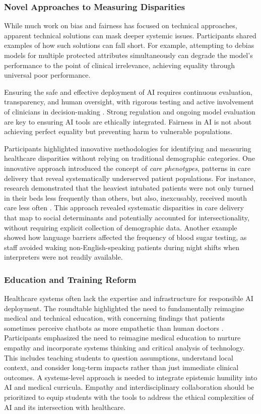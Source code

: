 \subsubsection{Novel Approaches to Measuring Disparities}
While much work on bias and fairness has focused on technical approaches, apparent technical solutions can mask deeper systemic issues. Participants shared examples of how such solutions can fall short. For example, attempting to debias models for multiple protected attributes simultaneously can degrade the model’s performance to the point of clinical irrelevance, achieving equality through universal poor performance. 

Ensuring the safe and effective deployment of AI requires continuous evaluation, transparency, and human oversight, with rigorous testing and active involvement of clinicians in decision-making \citep{adibi2020, Blumenthal2024}. Strong regulation and ongoing model evaluation are key to ensuring AI tools are ethically integrated. Fairness in AI is not about achieving perfect equality but preventing harm to vulnerable populations. 

Participants highlighted innovative methodologies for identifying and measuring healthcare disparities without relying on traditional demographic categories. One innovative approach introduced the concept of \textit{care phenotypes}, patterns in care delivery that reveal systematically underserved patient populations. For instance, research demonstrated that the heaviest intubated patients were not only turned in their beds less frequently than others, but also, inexcusably, received mouth care less often \citep{weishaupt_care_2025}. This approach revealed systematic disparities in care delivery that map to social determinants and potentially accounted for intersectionality, without requiring explicit collection of demographic data. Another example showed how language barriers affected the frequency of blood sugar testing, as staff avoided waking non-English-speaking patients during night shifts when interpreters were not readily available.

\subsubsection{Education and Training Reform}
Healthcare systems often lack the expertise and infrastructure for responsible AI deployment. The roundtable highlighted the need to fundamentally reimagine medical and technical education, with concerning findings that patients sometimes perceive chatbots as more empathetic than human doctors \citep{ayers_comparing_2023}. Participants emphasized the need to reimagine medical education to nurture empathy and incorporate systems thinking and critical analysis of technology. This includes teaching students to question assumptions, understand local context, and consider long-term impacts rather than just immediate clinical outcomes. A systems-level approach is needed to integrate epistemic humility into AI and medical curricula. Empathy and interdisciplinary collaboration should be prioritized to equip students with the tools to address the ethical complexities of AI and its intersection with healthcare. 

